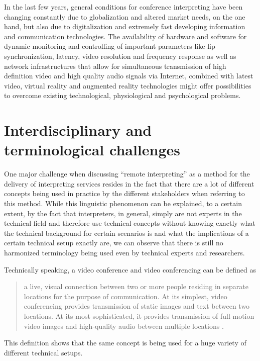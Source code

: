 \documentclass[output=paper]{langsci/langscibook}
\begin{document}
In the last few years, general conditions for conference interpreting have been changing constantly due to globalization and altered market needs, on the one hand, but also due to digitalization and extremely fast developing information and communication technologies. The availability of hardware and software for dynamic monitoring and controlling of important parameters like lip synchronization, latency, video resolution and frequency response as well as network infrastructures that allow for simultaneous transmission of high definition video and high quality audio signals via Internet, combined with latest video, virtual reality and augmented reality technologies might offer possibilities to overcome existing technological, physiological and psychological problems. 

\section{Interdisciplinary and terminological challenges}

\label{sec:ziegler:02}
One major challenge when discussing “remote interpreting” as a method for the delivery of interpreting services resides in the fact that there are a lot of different concepts being used in practice by the different stakeholders when referring to this method. While this linguistic phenomenon can be explained, to a certain extent, by the fact that interpreters, in general, simply are not experts in the technical field and therefore use technical concepts without knowing exactly what the technical background for certain scenarios is and what the implications of a certain technical setup exactly are, we can observe that there is still no harmonized terminology being used even by technical experts and researchers. 

Technically speaking, a video conference and video conferencing can be defined as 

\begin{quote}
	a live, visual connection between two or more people residing in separate locations for the purpose of communication. At its simplest, video conferencing provides transmission of static images and text between two locations. At its most sophisticated, it provides transmission of full-motion video images and high-quality audio between multiple locations \citep{TechTarget2017}.
\end{quote}

This definition shows that the same concept is being used for a huge variety of different technical setups.
\end{document}
